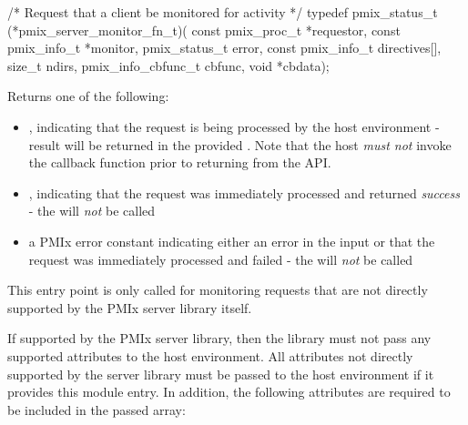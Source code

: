 \format

\cspecificstart
\begin{codepar}
/* Request that a client be monitored for activity */
typedef pmix_status_t (*pmix_server_monitor_fn_t)(
                             const pmix_proc_t *requestor,
                             const pmix_info_t *monitor, pmix_status_t error,
                             const pmix_info_t directives[], size_t ndirs,
                             pmix_info_cbfunc_t cbfunc, void *cbdata);
\end{codepar}
\cspecificend

\begin{arglist}
\end{arglist}

Returns one of the following:

\begin{itemize}
    \item {}, indicating that the request is being processed by the host environment - result will be returned in the provided . Note that the host \emph{must not} invoke the callback function prior to returning from the \ac{API}.
    \item {}, indicating that the request was immediately processed and returned \textit{success} - the  will \textit{not} be called
    \item a PMIx error constant indicating either an error in the input or that the request was immediately processed and failed - the  will \textit{not} be called
\end{itemize}

This entry point is only called for monitoring requests that are not directly supported by the \ac{PMIx} server library itself.

\reqattrstart
If supported by the \ac{PMIx} server library, then the library must not pass any supported attributes to the host environment. All attributes not directly supported by the server library must be passed to the host environment if it provides this module entry. In addition, the following attributes are required to be included in the passed  array:

